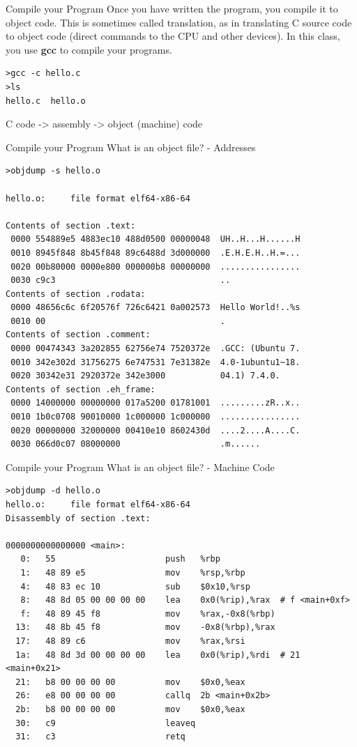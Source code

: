 \documentclass[10pt]{beamer}
\begin{document}
\begin{frame}[fragile]{Compile your Program}
Once you have written the program, you compile it to object code.
This is sometimes called translation, as in translating C source 
code to object code (direct commands to the CPU and other devices).
In this class, you use \textbf{gcc} to compile your programs.

		\begin{verbatim}
>gcc -c hello.c
>ls
hello.c  hello.o
 		\end{verbatim}

C code -> assembly -> object (machine) code 

\end{frame}
\begin{frame}[fragile]{Compile your Program}
What is an object file? - Addresses
\fontsize{8pt}{8pt}\selectfont
\begin{verbatim}
>objdump -s hello.o

hello.o:     file format elf64-x86-64

Contents of section .text:
 0000 554889e5 4883ec10 488d0500 00000048  UH..H...H......H
 0010 8945f848 8b45f848 89c6488d 3d000000  .E.H.E.H..H.=...
 0020 00b80000 0000e800 000000b8 00000000  ................
 0030 c9c3                                 ..              
Contents of section .rodata:
 0000 48656c6c 6f20576f 726c6421 0a002573  Hello World!..%s
 0010 00                                   .               
Contents of section .comment:
 0000 00474343 3a202855 62756e74 7520372e  .GCC: (Ubuntu 7.
 0010 342e302d 31756275 6e747531 7e31382e  4.0-1ubuntu1~18.
 0020 30342e31 2920372e 342e3000           04.1) 7.4.0.    
Contents of section .eh_frame:
 0000 14000000 00000000 017a5200 01781001  .........zR..x..
 0010 1b0c0708 90010000 1c000000 1c000000  ................
 0020 00000000 32000000 00410e10 8602430d  ....2....A....C.
 0030 066d0c07 08000000                    .m...... 
\end{verbatim}
\end{frame}
\begin{frame}[fragile]{Compile your Program}
What is an object file? - Machine Code
\fontsize{8pt}{8pt}\selectfont
\begin{verbatim}
>objdump -d hello.o
hello.o:     file format elf64-x86-64
Disassembly of section .text:

0000000000000000 <main>:
   0:	55                   	push   %rbp
   1:	48 89 e5             	mov    %rsp,%rbp
   4:	48 83 ec 10          	sub    $0x10,%rsp
   8:	48 8d 05 00 00 00 00 	lea    0x0(%rip),%rax  # f <main+0xf>
   f:	48 89 45 f8          	mov    %rax,-0x8(%rbp)
  13:	48 8b 45 f8          	mov    -0x8(%rbp),%rax
  17:	48 89 c6             	mov    %rax,%rsi
  1a:	48 8d 3d 00 00 00 00 	lea    0x0(%rip),%rdi  # 21 <main+0x21>
  21:	b8 00 00 00 00       	mov    $0x0,%eax
  26:	e8 00 00 00 00       	callq  2b <main+0x2b>
  2b:	b8 00 00 00 00       	mov    $0x0,%eax
  30:	c9                   	leaveq 
  31:	c3                   	retq
  
\end{verbatim}
\end{frame}
\end{document}

